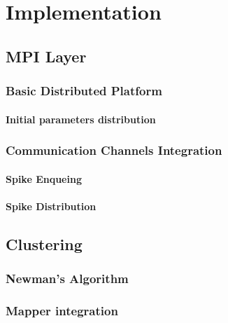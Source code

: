 \chapter{Implementation}

\section{MPI Layer}

\subsection{Basic Distributed Platform}

\subsubsection{Initial parameters distribution}

\subsection{Communication Channels Integration}

\subsubsection{Spike Enqueing}

\subsubsection{Spike Distribution}

\section{Clustering}

\subsection{Newman's Algorithm}

\subsection{Mapper integration}
